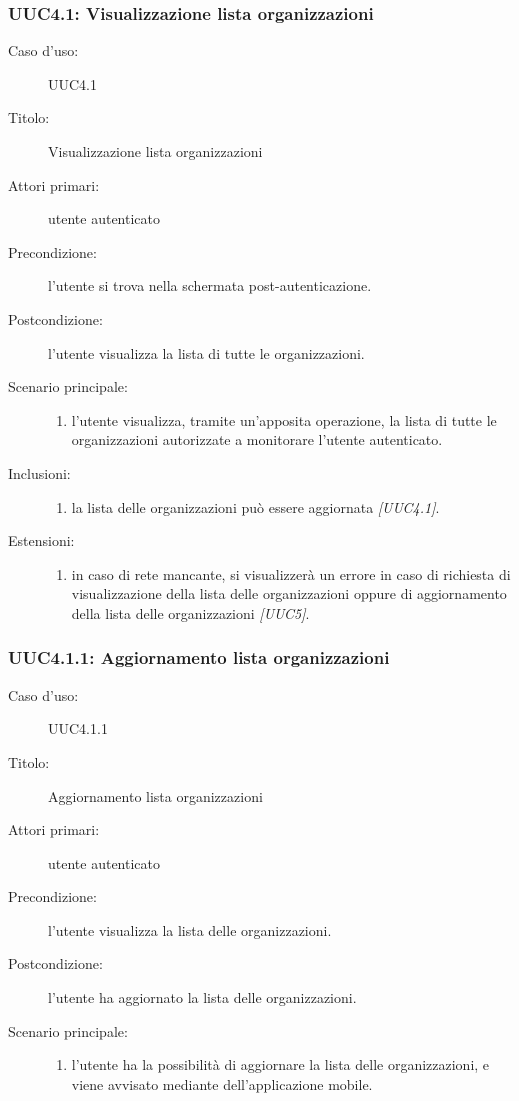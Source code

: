 \documentclass[../../../analisi-dei-requisiti.tex]{subfiles}
\begin{document}
\subsubsection{UUC4.1: Visualizzazione lista organizzazioni}%
\label{subs:UUC4.1}
\begin{description}
  \item[Caso d’uso:] UUC4.1
  \item[Titolo:] Visualizzazione lista organizzazioni
  \item[Attori primari:] utente autenticato
  \item[Precondizione:] l'utente si trova nella schermata post-autenticazione.
  \item[Postcondizione:] l'utente visualizza la lista di tutte le organizzazioni.
  \item[Scenario principale:]
        \begin{enumerate}
          \item l'utente visualizza, tramite un'apposita operazione, la lista di tutte le organizzazioni autorizzate a monitorare l'utente autenticato.
        \end{enumerate}
  \item[Inclusioni:]
        \begin{enumerate}
          \item la lista delle organizzazioni può essere aggiornata \emph{[UUC4.1]}.
        \end{enumerate}
  \item[Estensioni:]
        \begin{enumerate}
          \item in caso di rete mancante, si visualizzerà un errore in caso di richiesta di visualizzazione della lista delle organizzazioni
                oppure di aggiornamento della lista delle organizzazioni \emph{[UUC5]}.
        \end{enumerate}
\end{description}

\subsubsection{UUC4.1.1: Aggiornamento lista organizzazioni}%
\label{subs:UUC4.1.1}
\begin{description}
  \item[Caso d’uso:] UUC4.1.1
  \item[Titolo:] Aggiornamento lista organizzazioni
  \item[Attori primari:] utente autenticato
  \item[Precondizione:] l'utente visualizza la lista delle organizzazioni.
  \item[Postcondizione:] l'utente ha aggiornato la lista delle organizzazioni.
  \item[Scenario principale:]
        \begin{enumerate}
          \item l'utente ha la possibilità di aggiornare la lista delle organizzazioni, e viene avvisato mediante  dell'applicazione mobile.
        \end{enumerate}
\end{description}
\end{document}
